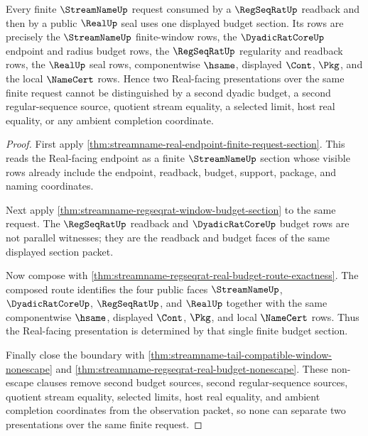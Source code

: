 \begin{theorem}
\label{thm:streamname-finite-request-section-budget-exactness}
Every finite $\StreamNameUp$ request consumed by a $\RegSeqRatUp$ readback and
then by a public $\RealUp$ seal uses one displayed budget section. Its rows
are precisely the $\StreamNameUp$ finite-window rows, the
$\DyadicRatCoreUp$ endpoint and radius budget rows, the $\RegSeqRatUp$
regularity and readback rows, the $\RealUp$ seal rows, componentwise
$\hsame$, displayed $\Cont$, $\Pkg$, and the local $\NameCert$ rows. Hence
two Real-facing presentations over the same finite request cannot be
distinguished by a second dyadic budget, a second regular-sequence source,
quotient stream equality, a selected limit, host real equality, or any ambient
completion coordinate.
\end{theorem}
\begin{proof}
First apply
\autoref{thm:streamname-real-endpoint-finite-request-section}. This reads the
Real-facing endpoint as a finite $\StreamNameUp$ section whose visible rows
already include the endpoint, readback, budget, support, package, and naming
coordinates.

Next apply \autoref{thm:streamname-regseqrat-window-budget-section} to the
same request. The $\RegSeqRatUp$ readback and $\DyadicRatCoreUp$ budget rows
are not parallel witnesses; they are the readback and budget faces of the
same displayed section packet.

Now compose with
\autoref{thm:streamname-regseqrat-real-budget-route-exactness}. The composed
route identifies the four public faces $\StreamNameUp$, $\DyadicRatCoreUp$,
$\RegSeqRatUp$, and $\RealUp$ together with the same componentwise $\hsame$,
displayed $\Cont$, $\Pkg$, and local $\NameCert$ rows. Thus the Real-facing
presentation is determined by that single finite budget section.

Finally close the boundary with
\autoref{thm:streamname-tail-compatible-window-nonescape} and
\autoref{thm:streamname-regseqrat-real-budget-nonescape}. These non-escape
clauses remove second budget sources, second regular-sequence sources,
quotient stream equality, selected limits, host real equality, and ambient
completion coordinates from the observation packet, so none can separate two
presentations over the same finite request.
\end{proof}

